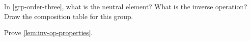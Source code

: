\vfill%

\begin{gradedexercise}
	\label{ex:GroupWithThreeElements}
	In \cref{grp-order-three}, what is the neutral element?
	What is the inverse operation?
	Draw the composition table for this group.
\end{gradedexercise}

\begin{gradedexercise}
	\label{ex:GroupInverseProperties}
	Prove \cref{lem:inv-op-properties}.
\end{gradedexercise}

